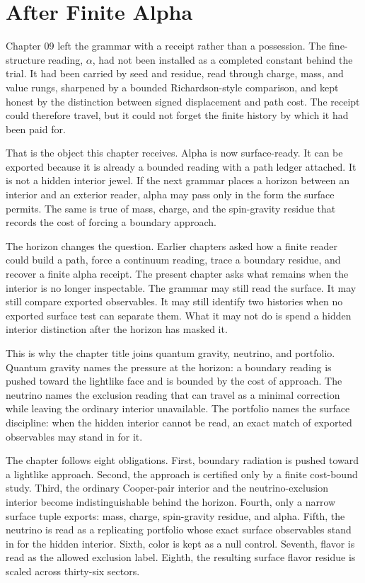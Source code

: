 \section{After Finite Alpha}

Chapter 09 left the grammar with a receipt rather than a possession. The
fine-structure reading, \(\alpha\), had not been installed as a completed
constant behind the trial. It had been carried by seed and residue, read
through charge, mass, and value rungs, sharpened by a bounded
Richardson-style comparison, and kept honest by the distinction between
signed displacement and path cost. The receipt could therefore travel, but it
could not forget the finite history by which it had been paid for.

That is the object this chapter receives. Alpha is now surface-ready. It can
be exported because it is already a bounded reading with a path ledger
attached. It is not a hidden interior jewel. If the next grammar places a
horizon between an interior and an exterior reader, alpha may pass only in
the form the surface permits. The same is true of mass, charge, and the
spin-gravity residue that records the cost of forcing a boundary approach.

The horizon changes the question. Earlier chapters asked how a finite reader
could build a path, force a continuum reading, trace a boundary residue, and
recover a finite alpha receipt. The present chapter asks what remains when
the interior is no longer inspectable. The grammar may still read the
surface. It may still compare exported observables. It may still identify
two histories when no exported surface test can separate them. What it may
not do is spend a hidden interior distinction after the horizon has masked
it.

This is why the chapter title joins quantum gravity, neutrino, and
portfolio. Quantum gravity names the pressure at the horizon: a boundary
reading is pushed toward the lightlike face and is bounded by the cost of
approach. The neutrino names the exclusion reading that can travel as a
minimal correction while leaving the ordinary interior unavailable. The
portfolio names the surface discipline: when the hidden interior cannot be
read, an exact match of exported observables may stand in for it.

The chapter follows eight obligations. First, boundary radiation is pushed
toward a lightlike approach. Second, the approach is certified only by a
finite cost-bound study. Third, the ordinary Cooper-pair interior and the
neutrino-exclusion interior become indistinguishable behind the horizon.
Fourth, only a narrow surface tuple exports: mass, charge, spin-gravity
residue, and alpha. Fifth, the neutrino is read as a replicating portfolio
whose exact surface observables stand in for the hidden interior. Sixth,
color is kept as a null control. Seventh, flavor is read as the allowed
exclusion label. Eighth, the resulting surface flavor residue is scaled
across thirty-six sectors.

